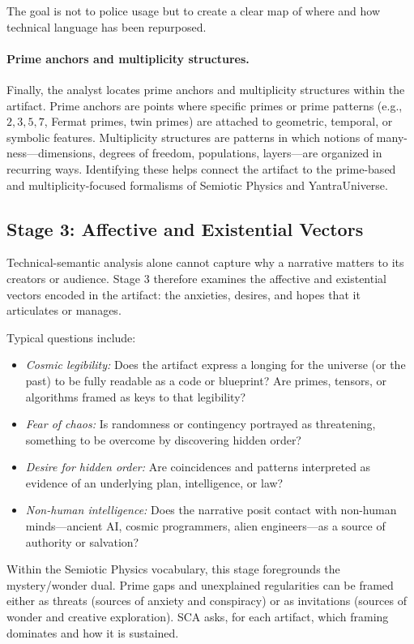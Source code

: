 \documentclass[12]{amsart}
\theoremstyle{plain}
\begin{document}
The goal is not to police usage but to create a clear map of where and how technical language has been repurposed.

\paragraph{Prime anchors and multiplicity structures.} Finally, the analyst locates prime anchors and multiplicity structures within the artifact. Prime anchors are points where specific primes or prime patterns (e.g., $2,3,5,7$, Fermat primes, twin primes) are attached to geometric, temporal, or symbolic features. Multiplicity structures are patterns in which notions of many-ness—dimensions, degrees of freedom, populations, layers—are organized in recurring ways. Identifying these helps connect the artifact to the prime-based and multiplicity-focused formalisms of Semiotic Physics and YantraUniverse.

\subsection{Stage 3: Affective and Existential Vectors}

Technical-semantic analysis alone cannot capture why a narrative matters to its creators or audience. Stage 3 therefore examines the affective and existential vectors encoded in the artifact: the anxieties, desires, and hopes that it articulates or manages.

Typical questions include:

\begin{itemize}
  \item \emph{Cosmic legibility:} Does the artifact express a longing for the universe (or the past) to be fully readable as a code or blueprint? Are primes, tensors, or algorithms framed as keys to that legibility?
  \item \emph{Fear of chaos:} Is randomness or contingency portrayed as threatening, something to be overcome by discovering hidden order?
  \item \emph{Desire for hidden order:} Are coincidences and patterns interpreted as evidence of an underlying plan, intelligence, or law?
  \item \emph{Non-human intelligence:} Does the narrative posit contact with non-human minds—ancient AI, cosmic programmers, alien engineers—as a source of authority or salvation?
\end{itemize}

Within the Semiotic Physics vocabulary, this stage foregrounds the mystery/wonder dual. Prime gaps and unexplained regularities can be framed either as threats (sources of anxiety and conspiracy) or as invitations (sources of wonder and creative exploration). SCA asks, for each artifact, which framing dominates and how it is sustained.
\end{document}
